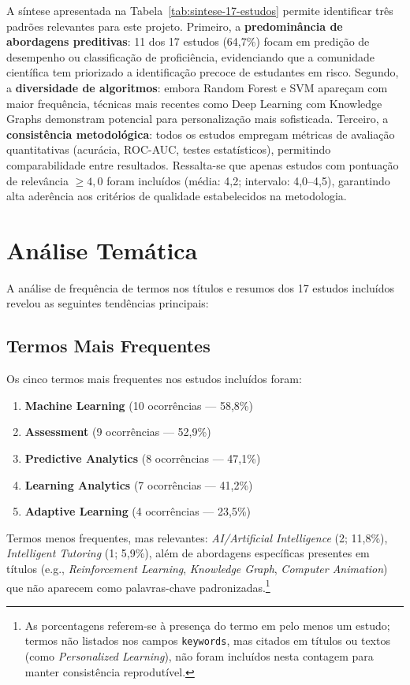 A síntese apresentada na Tabela~\ref{tab:sintese-17-estudos} permite identificar três padrões relevantes para este projeto. Primeiro, a \textbf{predominância de abordagens preditivas}: 11 dos 17 estudos (64,7\%) focam em predição de desempenho ou classificação de proficiência, evidenciando que a comunidade científica tem priorizado a identificação precoce de estudantes em risco. Segundo, a \textbf{diversidade de algoritmos}: embora Random Forest e SVM apareçam com maior frequência, técnicas mais recentes como Deep Learning com Knowledge Graphs \cite{Design2025_004} demonstram potencial para personalização mais sofisticada. Terceiro, a \textbf{consistência metodológica}: todos os estudos empregam métricas de avaliação quantitativas (acurácia, ROC-AUC, testes estatísticos), permitindo comparabilidade entre resultados. Ressalta-se que apenas estudos com pontuação de relevância $\geq 4{,}0$ foram incluídos (média: 4,2; intervalo: 4,0--4,5), garantindo alta aderência aos critérios de qualidade estabelecidos na metodologia.

\section{Análise Temática}

A análise de frequência de termos nos títulos e resumos dos 17 estudos incluídos 
revelou as seguintes tendências principais:

\subsection{Termos Mais Frequentes}

Os cinco termos mais frequentes nos estudos incluídos foram:

\begin{enumerate}
    \item \textbf{Machine Learning} (10 ocorrências --- 58,8\%)
    \item \textbf{Assessment} (9 ocorrências --- 52,9\%)
    \item \textbf{Predictive Analytics} (8 ocorrências --- 47,1\%)
    \item \textbf{Learning Analytics} (7 ocorrências --- 41,2\%)
    \item \textbf{Adaptive Learning} (4 ocorrências --- 23,5\%)
\end{enumerate}

Termos menos frequentes, mas relevantes: \textit{AI/Artificial Intelligence} (2; 11,8\%), \textit{Intelligent Tutoring} (1; 5,9\%), além de abordagens específicas presentes em títulos (e.g., \textit{Reinforcement Learning}, \textit{Knowledge Graph}, \textit{Computer Animation}) que não aparecem como palavras-chave padronizadas.\footnote{As porcentagens referem-se à presença do termo em pelo menos um estudo; termos não listados nos campos \texttt{keywords}, mas citados em títulos ou textos (como \textit{Personalized Learning}), não foram incluídos nesta contagem para manter consistência reprodutível.}

